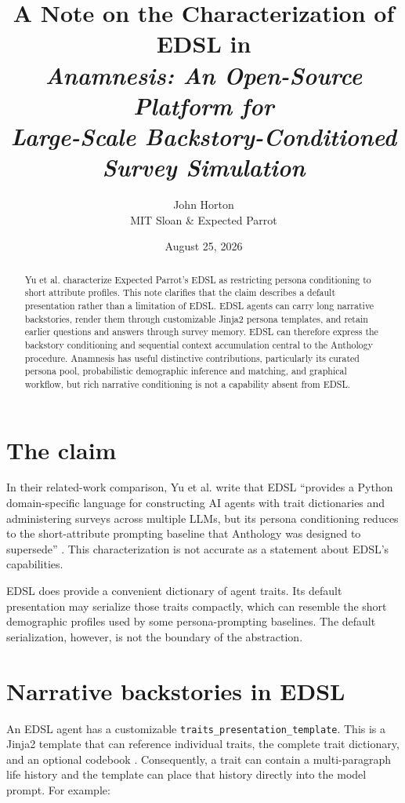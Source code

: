 \documentclass[11pt]{article}
\title{A Note on the Characterization of EDSL in\\
\textit{Anamnesis: An Open-Source Platform for\\
Large-Scale Backstory-Conditioned Survey Simulation}}
\author{John Horton\\\small MIT Sloan \& Expected Parrot}
\date{August 25, 2026}
\begin{document}
\maketitle

\begin{abstract}
Yu et al. characterize Expected Parrot's EDSL as restricting persona
conditioning to short attribute profiles. This note clarifies that the claim
describes a default presentation rather than a limitation of EDSL. EDSL agents
can carry long narrative backstories, render them through customizable Jinja2
persona templates, and retain earlier questions and answers through survey
memory. EDSL can therefore express the backstory conditioning and sequential
context accumulation central to the Anthology procedure. Anamnesis has useful
distinctive contributions, particularly its curated persona pool,
probabilistic demographic inference and matching, and graphical workflow, but
rich narrative conditioning is not a capability absent from EDSL.
\end{abstract}

\section{The claim}

In their related-work comparison, Yu et al. write that EDSL ``provides a
Python domain-specific language for constructing AI agents with trait
dictionaries and administering surveys across multiple LLMs, but its persona
conditioning reduces to the short-attribute prompting baseline that Anthology
was designed to supersede'' \cite{yu2026anamnesis}. This characterization is
not accurate as a statement about EDSL's capabilities.

EDSL does provide a convenient dictionary of agent traits. Its default
presentation may serialize those traits compactly, which can resemble the
short demographic profiles used by some persona-prompting baselines. The
default serialization, however, is not the boundary of the abstraction.

\section{Narrative backstories in EDSL}

An EDSL agent has a customizable \texttt{traits\_presentation\_template}.
This is a Jinja2 template that can reference individual traits, the complete
trait dictionary, and an optional codebook \cite{edsl}. Consequently, a trait
can contain a multi-paragraph life history and the template can place that
history directly into the model prompt. For example:
\end{document}
